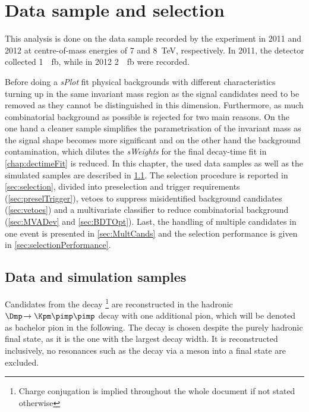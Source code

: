 \chapter{Data sample and selection}
\label{chap:selection}

\linespread{1.08}\selectfont
This analysis is done on the data sample recorded by the \lhcb experiment in \num{2011} and \num{2012} at centre-of-mass energies of \num{7} and \SI{8}{\tera\electronvolt}, respectively.
In \num{2011}, the detector collected \SI{1}{\per\femto\barn}, while in \num{2012} \SI{2}{\per\femto\barn} were recorded.

Before doing a \emph{sPlot} fit physical backgrounds with different \CP characteristics turning up in the same invariant mass region as the signal \BdToDpi candidates need to be removed as they cannot be distinguished in this dimension.
Furthermore, as much combinatorial background as possible is rejected for two main reasons.
On the one hand a cleaner sample simplifies the parametrisation of the invariant mass as the signal shape becomes more significant and on the other hand the background contamination, which dilutes the \emph{sWeights} for the final decay-time fit in \cref{chap:dectimeFit} is reduced.
In this chapter, the used data samples as well as the simulated samples are described in \cref{sec:Samples}.
The selection procedure is reported in \cref{sec:selection}, divided into preselection and trigger requirements (\cref{sec:preselTrigger}), vetoes to suppress \eg misidentified background candidates (\cref{sec:vetoes}) and a multivariate classifier to reduce combinatorial background (\cref{sec:MVADev} and \cref{sec:BDTOpt}).
Last, the handling of multiple \mbox{\B candidates} in one event is presented in \cref{sec:MultCands} and the selection performance is given in \cref{sec:selectionPerformance}.

\section{Data and simulation samples}
\label{sec:Samples}

Candidates from the decay \BdToDpi\footnote{Charge conjugation is implied throughout the whole document if not stated otherwise} are reconstructed in the hadronic \mbox{$\Dmp\!\to\Kpm\pimp\pimp$} decay with one additional pion, which will be denoted as bachelor pion in the following.
The \D decay is chosen despite the purely hadronic final state, as it is the one with the largest decay width.
It is reconstructed inclusively, \ie no resonances such as the decay via a \Kstarz meson into a \kaon\pion final state are excluded.

